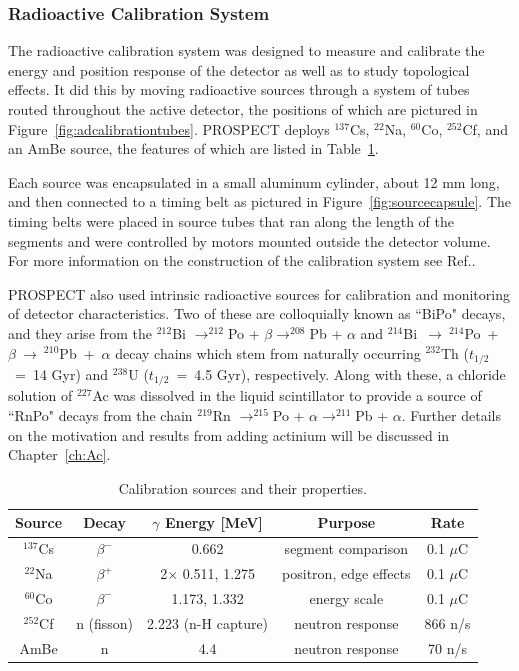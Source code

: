 \subsubsection{Radioactive Calibration System}

The radioactive calibration system was designed to measure and calibrate the energy and position response of the detector as well as to study topological effects. 
It did this by moving radioactive sources through a system of tubes routed throughout the active detector, the positions of which are pictured in Figure~\ref{fig:adcalibrationtubes}.
PROSPECT deploys $^{137}$Cs, $^{22}$Na, $^{60}$Co, $^{252}$Cf, and an AmBe source, the features of which are listed in Table~\ref{tab:Sources}.

Each source was encapsulated in a small aluminum cylinder, about 12 mm long, and then connected to a timing belt as pictured in Figure~\ref{fig:sourcecapsule}.
The timing belts were placed in source tubes that ran along the length of the segments and were controlled by motors mounted outside the detector volume. 
For more information on the construction of the calibration system see Ref.\cite{Ashenfelter:2019jzp}.

PROSPECT also used intrinsic radioactive sources for calibration and monitoring of detector characteristics. 
Two of these are colloquially known as ``BiPo" decays, and they arise from the $^{212}$Bi $\rightarrow ^{212}$Po + $\beta \rightarrow ^{208}$Pb + $\alpha$ and $^{214}$Bi~$\rightarrow~^{214}$Po~+~$\beta~\rightarrow~^{210}$Pb~+~$\alpha$ decay chains which stem from naturally occurring $^{232}$Th ($t_{1/2}$~=~14 Gyr) and $^{238}$U ($t_{1/2}$~=~4.5 Gyr), respectively.
Along with these, a chloride solution of $^{227}$Ac was dissolved in the liquid scintillator to provide a source of ``RnPo" decays from the chain $^{219}$Rn $\rightarrow ^{215}$Po + $\alpha \rightarrow ^{211}$Pb + $\alpha$.
Further details on the motivation and results from adding actinium will be discussed in Chapter~\ref{ch:Ac}.


\begin{table}[t]
	\centering
\begin{tabular}{|c|c|c|c|c|}
	\hline 
	\bf{Source} & \bf{Decay} & \bf{$\gamma$ Energy [MeV]} & Purpose & Rate \\ 
	\hline 
	$^{137}$Cs & $\beta^-$ & 0.662 & segment comparison & 0.1 $\mu$C \\ 
	\hline 
	$^{22}$Na & $\beta^+$ & 2$\times$ 0.511, 1.275 & positron, edge effects & 0.1 $\mu$C \\ 
	\hline 
	$^{60}$Co & $\beta^-$ & 1.173, 1.332 & energy scale & 0.1 $\mu$C \\ 
	\hline 
	$^{252}$Cf & n (fisson) & 2.223 (n-H capture) & neutron response & 866 n/s \\ 
	\hline 
	AmBe & n & 4.4 & neutron response & 70 n/s \\ 
	\hline 
\end{tabular} 
\caption{Calibration sources and their properties.}
\label{tab:Sources}
\end{table}

